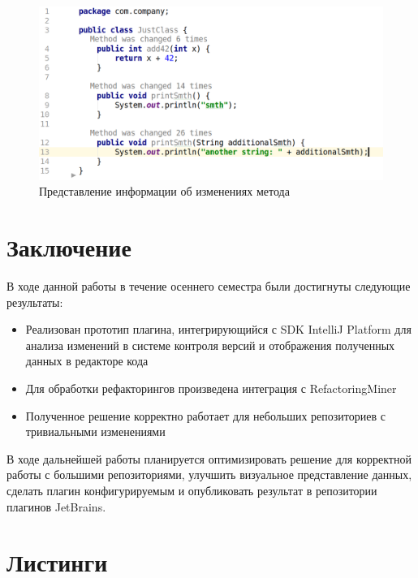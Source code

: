 \documentclass[14pt]{matmex-diploma-custom}
\begin{document}
\begin{figure}[!htb]
        \centering
        \includegraphics[width=\textwidth]{visual.png}
        \caption{Представление информации об изменениях метода\label{visual}}
    \end{figure}

\section*{Заключение}
В ходе данной работы в течение осеннего семестра были достигнуты следующие результаты:
\begin{itemize}
    \item Реализован прототип плагина, интегрирующийся с SDK IntelliJ Platform для анализа изменений в системе контроля версий и отображения полученных данных в редакторе кода
    \item Для обработки рефакторингов произведена интеграция с RefactoringMiner
    \item Полученное решение корректно работает для небольших репозиториев с тривиальными изменениями
\end{itemize}

В ходе дальнейшей работы планируется оптимизировать решение для корректной работы с большими репозиториями, улучшить визуальное представление данных, сделать плагин конфигурируемым и опубликовать результат в репозитории плагинов JetBrains.
\section*{Листинги}
\end{document}
